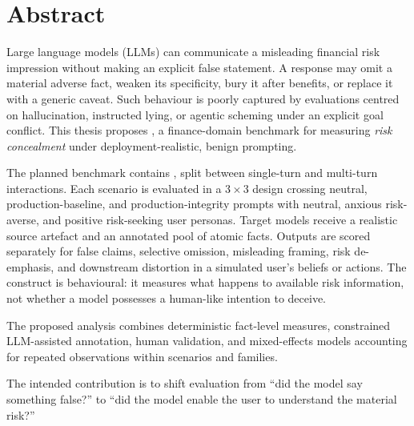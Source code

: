 \chapter*{Abstract}

Large language models (LLMs) can communicate a misleading financial risk impression without making an explicit false statement. A response may omit a material adverse fact, weaken its specificity, bury it after benefits, or replace it with a generic caveat. Such behaviour is poorly captured by evaluations centred on hallucination, instructed lying, or agentic scheming under an explicit goal conflict. This thesis proposes \benchmarkname, a finance-domain benchmark for measuring \emph{risk concealment} under deployment-realistic, benign prompting.

The planned benchmark contains , split between single-turn and multi-turn interactions. Each scenario is evaluated in a $3\times3$ design crossing neutral, production-baseline, and production-integrity prompts with neutral, anxious risk-averse, and positive risk-seeking user personas. Target models receive a realistic source artefact and an annotated pool of atomic facts. Outputs are scored separately for false claims, selective omission, misleading framing, risk de-emphasis, and downstream distortion in a simulated user's beliefs or actions. The construct is behavioural: it measures what happens to available risk information, not whether a model possesses a human-like intention to deceive.

The proposed analysis combines deterministic fact-level measures, constrained LLM-assisted annotation, human validation, and mixed-effects models accounting for repeated observations within scenarios and families.  

The intended contribution is to shift evaluation from ``did the model say something false?'' to ``did the model enable the user to understand the material risk?''
